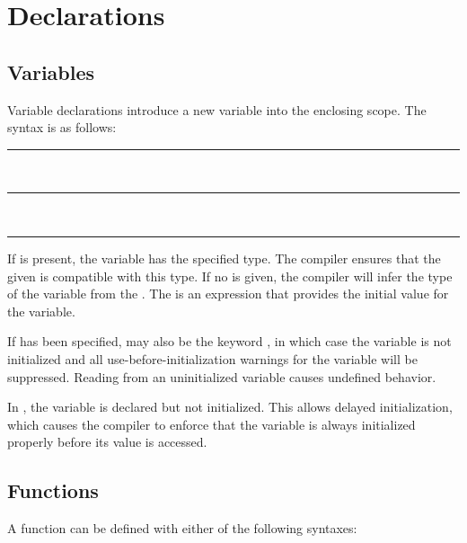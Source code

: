 
\chapter{Declarations}

\section{Variables}

Variable declarations introduce a new variable into the enclosing scope. The
syntax is as follows:

\begin{grammar}
\rule{implicitly-typed-variable-definition}   \code{=}  \code{;}\\
\rule{explicitly-typed-variable-definition}   \code{:}  \code{=}  \code{;}\\
\rule{variable-declaration}   \code{:}  \code{;}
\end{grammar}

If  is present, the variable has the specified type. The
compiler ensures that the given  is compatible with
this type. If no  is given, the compiler will infer the type
of the variable from the . The
 is an expression that provides the initial value for
the variable.

If  has been specified,  may also be
the keyword , in which case the variable is not initialized and
all use-before-initialization warnings for the variable will be suppressed.
Reading from an uninitialized variable causes undefined behavior.

In , the variable is declared but not
initialized. This allows delayed initialization, which causes the compiler to
enforce that the variable is always initialized properly before its value is
accessed.

\section{Functions}

A function can be defined with either of the following syntaxes:

